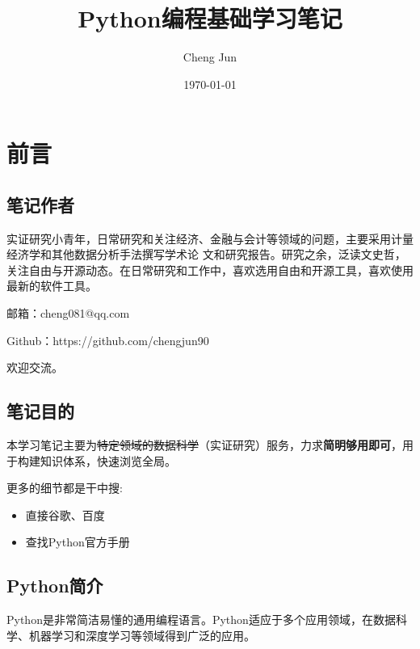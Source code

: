 \documentclass[12pt]{ctexart}
\title{\textbf{\LARGE{Python编程基础学习笔记}}}
\author{Cheng Jun}
\date{\today}
\providecommand{\tightlist}{%
      \setlength{\itemsep}{0pt}\setlength{\parskip}{0pt}}
\begin{document}
    
    
    \maketitle
    \tableofcontents
    \clearpage
    
    

    
    \hypertarget{ux524dux8a00}{%
\section{前言}\label{ux524dux8a00}}

    \hypertarget{ux7b14ux8bb0ux4f5cux8005}{%
\subsection{笔记作者}\label{ux7b14ux8bb0ux4f5cux8005}}

实证研究小⻘年，日常研究和关注经济、金融与会计等领域的问题，主要采用计量经济学和其他数据分析手法撰写学术论
文和研究报告。研究之余，泛读文史哲，关注自由与开源动态。在日常研究和工作中，喜欢选用自由和开源工具，喜欢使用最新的软件工具。

邮箱：cheng081@qq.com

Github：https://github.com/chengjun90

欢迎交流。

    \hypertarget{ux7b14ux8bb0ux76eeux7684}{%
\subsection{笔记目的}\label{ux7b14ux8bb0ux76eeux7684}}

本学习笔记主要为\sout{特定领域的数据科学}（实证研究）服务，力求\textbf{简明够用即可}，用于构建知识体系，快速浏览全局。

更多的细节都是干中搜:

\begin{itemize}
\tightlist
\item
  直接谷歌、百度
\item
  查找Python官方手册
\end{itemize}

    \hypertarget{pythonux7b80ux4ecb}{%
\subsection{Python简介}\label{pythonux7b80ux4ecb}}

Python是非常简洁易懂的通用编程语言。Python适应于多个应用领域，在数据科学、机器学习和深度学习等领域得到广泛的应用。
\end{document}
